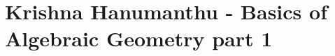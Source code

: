 
\chapter[Basics of Algebraic Geometry I]{Krishna Hanumanthu - Basics of Algebraic Geometry part 1}


